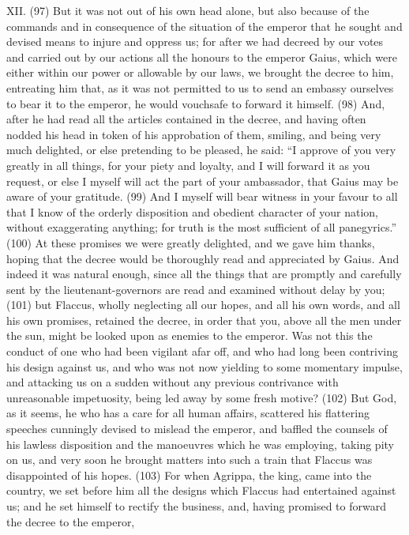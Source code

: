 XII. (97) But it was not out of his own head alone, but also because of the commands and in
consequence of the situation of the emperor that he sought and devised means to injure and
oppress us; for after we had decreed by our votes and carried out by our actions all the honours to
the emperor Gaius, which were either within our power or allowable by our laws, we brought the
decree to him, entreating him that, as it was not permitted to us to send an embassy ourselves to
bear it to the emperor, he would vouchsafe to forward it himself. (98) And, after he had read all the
articles contained in the decree, and having often nodded his head in token of his approbation of
them, smiling, and being very much delighted, or else pretending to be pleased, he said: ``I approve
of you very greatly in all things, for your piety and loyalty, and I will forward it as you request, or else
I myself will act the part of your ambassador, that Gaius may be aware of your gratitude. (99) And I
myself will bear witness in your favour to all that I know of the orderly disposition and obedient
character of your nation, without exaggerating anything; for truth is the most sufficient of all
panegyrics.'' (100) At these promises we were greatly delighted, and we gave him thanks, hoping
that the decree would be thoroughly read and appreciated by Gaius. And indeed it was natural
enough, since all the things that are promptly and carefully sent by the lieutenant-governors are
read and examined without delay by you; (101) but Flaccus, wholly neglecting all our hopes, and all
his own words, and all his own promises, retained the decree, in order that you, above all the men
under the sun, might be looked upon as enemies to the emperor. Was not this the conduct of one
who had been vigilant afar off, and who had long been contriving his design against us, and who
was not now yielding to some momentary impulse, and attacking us on a sudden without any
previous contrivance with unreasonable impetuosity, being led away by some fresh motive? (102)
But God, as it seems, he who has a care for all human affairs, scattered his flattering speeches
cunningly devised to mislead the emperor, and baffled the counsels of his lawless disposition and
the manoeuvres which he was employing, taking pity on us, and very soon he brought matters into
such a train that Flaccus was disappointed of his hopes. (103) For when Agrippa, the king, came
into the country, we set before him all the designs which Flaccus had entertained against us; and
he set himself to rectify the business, and, having promised to forward the decree to the emperor,
